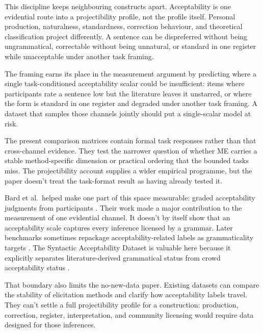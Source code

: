 This discipline keeps neighbouring constructs apart. Acceptability is one
evidential route into a projectibility profile, not the profile itself. Personal
production, naturalness, standardness, correction behaviour, and theoretical
classification project differently. A sentence can be dispreferred without
being ungrammatical, correctable without being unnatural, or standard in one
register while unacceptable under another task framing.

The framing earns its place in the measurement argument by predicting where a
single task-conditioned acceptability scalar could be insufficient: items where
participants rate a sentence low but the literature leaves it unstarred, or
where the form is standard in one register and degraded under another task
framing. A dataset that samples those channels jointly should put a
single-scalar model at risk.

The present comparison matrices contain formal task responses rather than that
cross-channel evidence. They test the narrower question of whether ME
carries a stable method-specific dimension or practical ordering that the
bounded tasks miss. The projectibility account supplies a wider empirical
programme, but the paper doesn't treat the task-format result as having already
tested it.

Bard et al.\ helped make one part of this space measurable: graded
acceptability judgments from participants \citep{BardEtAl1996}. Their work made a
major contribution to the measurement of one evidential channel. It doesn't by
itself show that an acceptability scale captures every inference licensed by a
grammar. Later benchmarks sometimes repackage acceptability-related labels as
grammaticality targets \citep{WarstadtEtAl2019CoLA,WarstadtEtAl2020}. The
Syntactic Acceptability Dataset is valuable here because it explicitly
separates literature-derived grammatical status from crowd acceptability status
\citep{juzek2024}.

That boundary also limits the no-new-data paper. Existing datasets can compare
the stability of elicitation methods and clarify how acceptability labels
travel. They can't settle a full projectibility profile for a construction:
production, correction, register, interpretation, and community licensing would
require data designed for those inferences.
